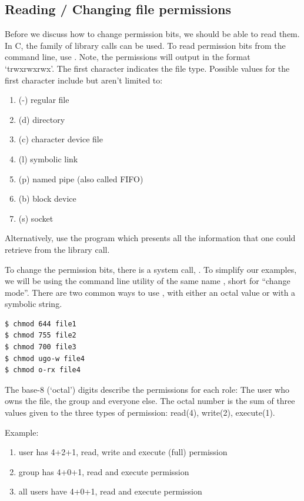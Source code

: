\subsection{Reading / Changing file permissions}

Before we discuss how to change permission bits, we should be able to read them.
In C, the  family of library calls can be used.
To read permission bits from the command line, use .
Note, the permissions will output in the format `trwxrwxrwx'.
The first character indicates the file type.
Possible values for the first character include but aren't limited to:

\begin{enumerate}
    \item (-) regular file
    \item (d) directory
    \item (c) character device file
    \item (l) symbolic link
    \item (p) named pipe (also called FIFO)
    \item (b) block device
    \item (s) socket
\end{enumerate}

Alternatively, use the program  which presents all the information that one could retrieve from the  library call.

To change the permission bits, there is a system call, .
To simplify our examples, we will be using the command line utility of the same name , short for ``change mode''.
There are two common ways to use , with either an octal value or with a symbolic string.

\begin{lstlisting}[language=bash]
$ chmod 644 file1
$ chmod 755 file2
$ chmod 700 file3
$ chmod ugo-w file4
$ chmod o-rx file4
\end{lstlisting}

The base-8 (`octal') digits describe the permissions for each role: The user who owns the file, the group and everyone else.
The octal number is the sum of three values given to the three types of permission: read(4), write(2), execute(1).

Example: 

\begin{enumerate}
\item user has 4+2+1, read, write and execute (full) permission
\item group has 4+0+1, read and execute permission
\item all users have 4+0+1, read and execute permission
\end{enumerate}

